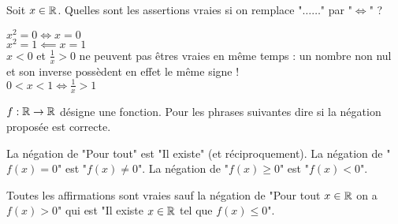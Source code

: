 \begin{question}
Soit $x\in\mathbb{R}$. Quelles sont les assertions vraies si on remplace "$\ldots\ldots$" par "$\iff$" ?
\begin{answers} 
\end{answers}
\begin{explanations}
$x^2 = 0  \iff x = 0$ \\
$x^2 = 1  \impliedby x = 1$ \\
$x<0$ et $\frac1x > 0$ ne peuvent pas êtres vraies en même temps : un nombre non nul et son inverse possèdent en effet le même signe !\\
$0<x<1  \iff \frac1x > 1$ \\
\end{explanations}
\end{question}


\begin{question}
$f : \mathbb{R} \to \mathbb{R}$ désigne une fonction. 
Pour les phrases suivantes dire si la négation proposée est correcte.
\begin{answers} 
\end{answers}
\begin{explanations}
La négation de "Pour tout" est "Il existe" (et réciproquement). La négation de "$f(x)=0$" est "$f(x) \neq 0$".  La négation de "$f(x)\ge0$" est "$f(x) < 0$".

Toutes les affirmations sont vraies sauf la négation de "Pour tout $x\in\mathbb{R}$ on a $f(x)>0$" qui est "Il existe $x\in\mathbb{R}$ tel que $f(x)\le0$".
\end{explanations}
\end{question}


